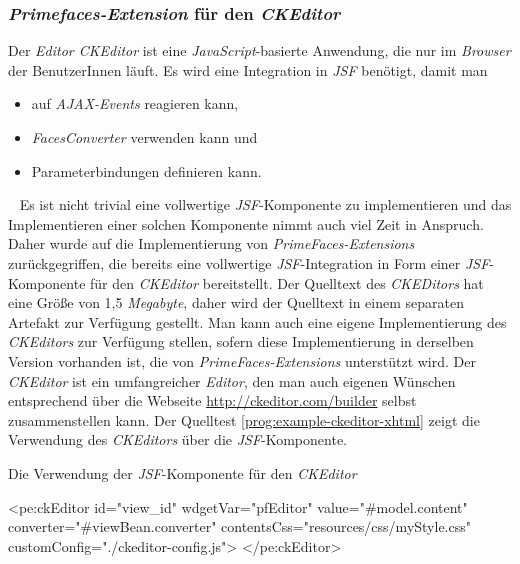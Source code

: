 \subsubsection{\emph{Primefaces-Extension} für den \emph{CKEditor}}
Der \emph{Editor CKEditor} ist eine \emph{JavaScript}-basierte Anwendung, die nur im \emph{Browser} der BenutzerInnen läuft. Es wird eine Integration in \emph{JSF} benötigt, damit man
\begin{itemize}
	\item auf \emph{AJAX-Events} reagieren kann,
	\item\emph{FacesConverter} verwenden kann und
	\item Parameterbindungen definieren kann.
\end{itemize}
\ \newline
Es ist nicht trivial eine vollwertige \emph{JSF}-Komponente zu implementieren und das Implementieren einer solchen Komponente nimmt auch viel Zeit in Anspruch. Daher wurde auf die Implementierung von \emph{PrimeFaces-Extensions} zurückgegriffen, die bereits eine vollwertige \emph{JSF}-Integration in Form einer \emph{JSF}-Komponente für den \emph{CKEditor} bereitstellt.
\newline
\newline
Der Quelltext des \emph{CKEDitors} hat eine Größe von 1,5 \emph{Megabyte}, daher wird der Quelltext in einem separaten Artefakt zur Verfügung gestellt. Man kann auch eine eigene Implementierung des \emph{CKEditors} zur Verfügung stellen, sofern diese Implementierung in derselben Version vorhanden ist, die von \emph{PrimeFaces-Extensions} unterstützt wird. Der \emph{CKEditor} ist ein umfangreicher \emph{Editor}, den man auch eigenen Wünschen entsprechend über die Webseite \url{http://ckeditor.com/builder} selbst zusammenstellen kann.
\newline
\newline
Der Quelltest \ref{prog:example-ckeditor-xhtml} zeigt die Verwendung des \emph{CKEditors} über die \emph{JSF}-Komponente.
\begin{program}[h]
\caption{Die Verwendung der \emph{JSF}-Komponente für den \emph{CKEditor}}
\label{prog:example-ckeditor-xhtml}
\begin{HtmlCode}
<pe:ckEditor id="view_id"
             wdgetVar="pfEditor"
             value="#{model.content}"
             converter="#{viewBean.converter}" 
             contentsCss="resources/css/myStyle.css"
             customConfig="./ckeditor-config.js">
</pe:ckEditor>
\end{HtmlCode}
\end{program}
